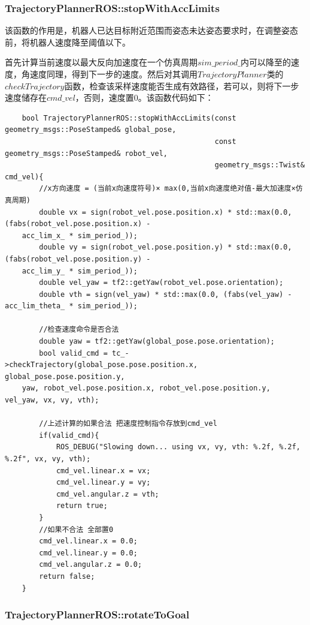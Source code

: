 \documentclass[9pt, oneside]{book}
\begin{document}
\subsubsection{TrajectoryPlannerROS::stopWithAccLimits}

该函数的作用是，机器人已达目标附近范围而姿态未达姿态要求时，在调整姿态前，将机器人速度降至阈值以下。

首先计算当前速度以最大反向加速度在一个仿真周期$sim\_period\_$内可以降至的速度，角速度同理，得到下一步的速度。然后对其调用$TrajectoryPlanner$类的$checkTrajectory$函数，检查该采样速度能否生成有效路径，若可以，则将下一步速度储存在$cmd\_vel$，否则，速度置0。该函数代码如下：

\footnotesize
\begin{verbatim}
    bool TrajectoryPlannerROS::stopWithAccLimits(const geometry_msgs::PoseStamped& global_pose, 
                                                 const geometry_msgs::PoseStamped& robot_vel, 
                                                 geometry_msgs::Twist& cmd_vel){
        //x方向速度 = (当前x向速度符号)× max(0,当前x向速度绝对值-最大加速度×仿真周期)
        double vx = sign(robot_vel.pose.position.x) * std::max(0.0, (fabs(robot_vel.pose.position.x) -
    acc_lim_x_ * sim_period_));
        double vy = sign(robot_vel.pose.position.y) * std::max(0.0, (fabs(robot_vel.pose.position.y) - 
    acc_lim_y_ * sim_period_));
        double vel_yaw = tf2::getYaw(robot_vel.pose.orientation);
        double vth = sign(vel_yaw) * std::max(0.0, (fabs(vel_yaw) - acc_lim_theta_ * sim_period_));

        //检查速度命令是否合法
        double yaw = tf2::getYaw(global_pose.pose.orientation);
        bool valid_cmd = tc_->checkTrajectory(global_pose.pose.position.x, global_pose.pose.position.y, 
    yaw, robot_vel.pose.position.x, robot_vel.pose.position.y, vel_yaw, vx, vy, vth);

        //上述计算的如果合法 把速度控制指令存放到cmd_vel
        if(valid_cmd){
            ROS_DEBUG("Slowing down... using vx, vy, vth: %.2f, %.2f, %.2f", vx, vy, vth);
            cmd_vel.linear.x = vx;
            cmd_vel.linear.y = vy;
            cmd_vel.angular.z = vth;
            return true;
        }
        //如果不合法 全部置0
        cmd_vel.linear.x = 0.0;
        cmd_vel.linear.y = 0.0;
        cmd_vel.angular.z = 0.0;
        return false;
    }
\end{verbatim}
\normalsize

\subsubsection{TrajectoryPlannerROS::rotateToGoal}
\end{document}
